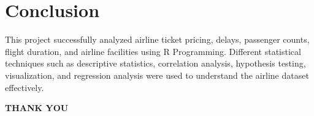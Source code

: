 \documentclass[12pt,a4paper]{article}
\begin{document}
\section{Conclusion}

This project successfully analyzed airline ticket pricing, delays, passenger counts, flight duration, and airline facilities using R Programming. Different statistical techniques such as descriptive statistics, correlation analysis, hypothesis testing, visualization, and regression analysis were used to understand the airline dataset effectively.

\vspace{1cm}

\begin{center}

{\Huge\bfseries\color{mainblue}THANK YOU}

\end{center}
\end{document}
